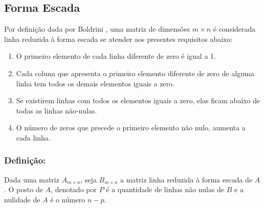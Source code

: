 
\subsection{Forma Escada}
\noindent Por definição dada por Boldrini \cite{1980:Boldrini}, uma matriz de dimensões $m \times n$ é considerada linha reduzida à forma escada se atender aos presentes requisitos abaixo:

\begin{enumerate}
    \item O primeiro elemento de cada linha diferente de zero é igual a 1.
    \item Cada coluna que apresenta o primeiro elemento diferente de zero de alguma linha tem todos os demais elementos iguais a zero.
    \item Se existirem linhas com todos os elementos iguais a zero, elas ficam abaixo de todas as linhas não-nulas.
    \item O número de zeros que precede o primeiro elemento não nulo, aumenta a cada linha.
\end{enumerate}

\subsubsection{Definição:}
\noindent Dada uma matriz $A_{m \times n}$, seja $B_{m \times n}$ a matriz linha reduzida à forma escada de $A$. O posto de $A$, denotado por $P$ é a quantidade de linhas não nulas de $B$ e a nulidade de $A$ é o número $n-p$.

